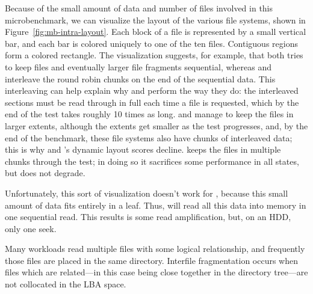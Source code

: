 

Because of the small amount of data and number of files involved in this
microbenchmark, we can visualize the layout of the various file systems, shown
in Figure~\ref{fig:mb-intra-layout}. Each block of a file is represented by a
small vertical bar, and each bar is colored uniquely to one of the ten files.
Contiguous regions form a colored rectangle.  The visualization suggests, for
example, that \ext both tries to keep files and eventually larger file
fragments sequential, whereas \btrfs and \ftwofs interleave the round robin
chunks on the end of the sequential data. This interleaving can help explain
why \btrfs and \ftwofs perform the way they do: the interleaved sections must
be read through in full each time a file is requested, which by the end of the
test takes roughly 10 times as long. \ext and \xfs manage to keep the files in
larger extents, although the extents get smaller as the test progresses, and,
by the end of the benchmark, these file systems also have chunks of interleaved
data; this is why \ext and \xfs's  dynamic layout scores decline.  \zfs keeps
the files in multiple chunks through the test; in doing so it sacrifices some
performance in all states, but does not degrade.

Unfortunately, this sort of visualization doesn't work for \betrfs, because
this small amount of data fits entirely in a leaf.  Thus, \betrfs will read all
this data into memory in one sequential read. This results is some read
amplification, but, on an HDD, only one seek.




\label{sec:interfile} Many workloads read
multiple files with some logical relationship, and frequently those files are
placed in the same directory. Interfile fragmentation occurs when files which
are related---in this case being close together in the directory tree---are not
collocated in the LBA space. %

